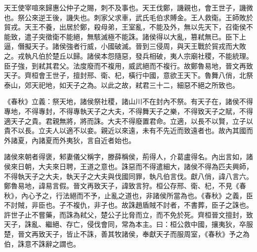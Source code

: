天王使宰喧來歸惠公仲子之賜，刺不及事也。天王伐鄭，譏親也，會王世子，譏微也。祭公來逆王後，譏失也。刺家父求車，武氏毛伯求賻金。王人救衛。王師敗於貿戎。天王不養，出居於鄭，殺母弟，王室亂，不能及外，無以先天下，召衛侯不能致，遣子突徵衛不能絕，無駭滅極不能誅。諸侯得以大亂，篡弒無已。臣下上逼，僭擬天子。諸侯強者行威，小國破滅。晉到三侵周，與天王戰於貿戎而大敗之。戎執凡伯於楚丘以歸。諸侯本怨隨惡，發兵相破，夷人宗廟社稷，不能統理。臣子強，到弒其君父。法度廢而不複用，威武絕而不複行。故鄭魯易地，晉文再致天子。齊桓會王世子，擅封邢、衛、杞，橫行中國，意欲王天下。魯舞八俏，北祭泰山，郊天祀地，如天子之為。以此之故，弒君三十二，細惡不絕之所致也。


《春秋》立義：祭天地，諸侯祭社稷，諸山川不在封內不祭。有天子在，諸侯不得專地，不得專封，不得專執天子之大夫，不得舞天子之樂，不得致天子之賦，不得適天子之貴。君親無將，將而誅。大夫不得廢置君命。立適，以長不以賢，立子以貴不以長。立夫人以適不以妾。親近以來遠，未有不先近而致遠者也。故內其國而外諸夏，內諸夏而外夷狄，言自近者始也。


諸侯來朝者得褒，邾妻儀父稱字，滕薛稱侯，荊得人，介葛盧得名。內出言如，諸侯來日朝，大夫來日聘，王道之意也。誅惡而不得遣細大，諸侯不得為匹夫興師，不得執天子之大夫，執天子之大夫與伐國同罪，執凡伯言伐。獻八俏，諱八言六。鄭魯易地，諱易言假。晉文再致天子，諱致言狩。桓公存邢、衛、杞，不見《春秋》，內心予之，行法絕而不予，止亂之道也，非諸侯所當為也。《春秋》之義，臣不討賊，非臣也。子不複仇，非子也。故誅趙盾賊不討者，不書葬，臣子之誅也。許世子止不嘗藥，而誅為弒父，楚公子比脅而立，而不免於死。齊桓晉文擅封，致天子，誅亂、繼絕、存亡，侵伐會同，常為本主。曰：桓公救中國，攘夷狄，卒服楚，晉文再致天子，皆止不誅，善其牧諸侯，奉獻天子而服周室，《春秋》予之為伯，誅意不誅辭之謂也。


